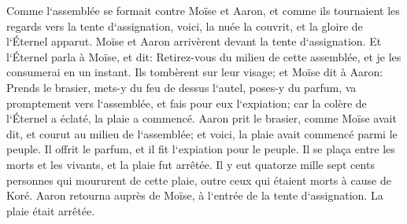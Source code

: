 \verse Comme l`assemblée se formait contre Moïse et Aaron, et comme ils tournaient les regards vers la tente d`assignation, voici, la nuée la couvrit, et la gloire de l`Éternel apparut. 
\verse Moïse et Aaron arrivèrent devant la tente d`assignation. 
\verse Et l`Éternel parla à Moïse, et dit: 
\verse Retirez-vous du milieu de cette assemblée, et je les consumerai en un instant. Ils tombèrent sur leur visage; 
\verse et Moïse dit à Aaron: Prends le brasier, mets-y du feu de dessus l`autel, poses-y du parfum, va promptement vers l`assemblée, et fais pour eux l`expiation; car la colère de l`Éternel a éclaté, la plaie a commencé. 
\verse Aaron prit le brasier, comme Moïse avait dit, et courut au milieu de l`assemblée; et voici, la plaie avait commencé parmi le peuple. Il offrit le parfum, et il fit l`expiation pour le peuple. 
\verse Il se plaça entre les morts et les vivants, et la plaie fut arrêtée. 
\verse Il y eut quatorze mille sept cents personnes qui moururent de cette plaie, outre ceux qui étaient morts à cause de Koré. 
\verse Aaron retourna auprès de Moïse, à l`entrée de la tente d`assignation. La plaie était arrêtée. 

\chapter{}

